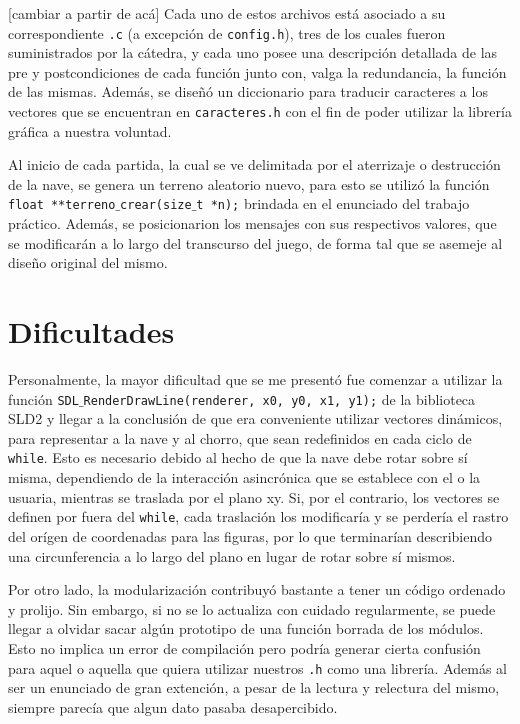 \documentclass[a4paper, 12pt, spanish]{article}
\begin{document}
[cambiar a partir de acá]
Cada uno de estos archivos está asociado a su correspondiente \texttt{.c} (a excepción de \texttt{config.h}), 
tres de los cuales fueron suministrados por la cátedra, y cada uno posee una descripción detallada
de las pre y postcondiciones de cada función junto con, valga la redundancia, la función de las mismas. Además, se diseñó un
diccionario para traducir caracteres a los vectores que se encuentran en \texttt{caracteres.h} con el fin
de poder utilizar la librería gráfica a nuestra voluntad. \newline

Al inicio de cada partida, la cual se ve delimitada por el aterrizaje o destrucción de la nave, 
se genera un terreno aleatorio nuevo, para esto se utilizó la función
\texttt{float **terreno$\_$crear(size$\_$t *n);} brindada en el enunciado del trabajo práctico. 
Además, se posicionarion los mensajes con sus respectivos valores, que se modificarán a lo largo del
transcurso del juego, de forma tal que se asemeje al diseño original del mismo.\newline


\section*{Dificultades}
Personalmente, la mayor dificultad que se me presentó fue comenzar a utilizar la función \texttt{SDL$\_$RenderDrawLine(renderer, x0, y0, x1, y1);}
de la biblioteca SLD2 y llegar a la conclusión de que era conveniente utilizar vectores dinámicos, para representar a la nave y al chorro,
que sean redefinidos en cada ciclo de \texttt{while}. Esto es necesario debido al hecho de que la nave debe rotar sobre sí
misma, dependiendo de la interacción asincrónica que se establece con el o la usuaria, mientras se traslada por el plano xy. Si, por el
contrario, los vectores se definen por fuera del \texttt{while}, cada traslación los modificaría y se perdería el rastro del orígen de coordenadas
para las figuras, por lo que terminarían describiendo una circunferencia a lo largo del plano en lugar de rotar sobre sí
mismos.\newline

Por otro lado, la modularización contribuyó bastante a tener un código ordenado y prolijo. Sin embargo, si no se lo actualiza con cuidado
regularmente, se puede llegar a olvidar sacar algún prototipo de una función borrada de los módulos. Esto no implica un error de 
compilación pero podría generar cierta confusión para aquel o aquella que quiera utilizar nuestros \texttt{.h} como una librería. Además
al ser un enunciado de gran extención, a pesar de la lectura y relectura del mismo, siempre parecía que algun dato pasaba desapercibido.\newline
\end{document}
